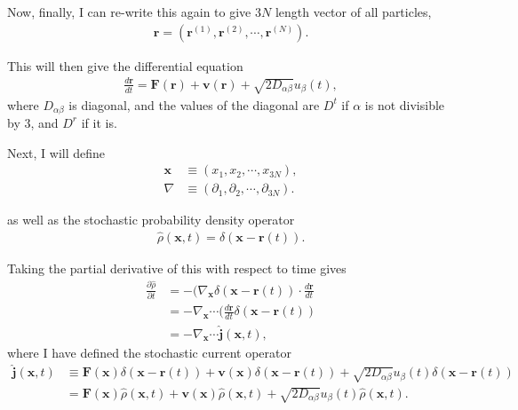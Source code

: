 \documentclass{article}
\begin{document}
Now, finally, I can re-write this again to give $3N$ length vector of all particles,
\begin{align}
    \bm{r}=(\bm{r}^{(1)},\bm{r}^{(2)},\cdots,\bm{r}^{(N)}).
\end{align}

This will then give the differential equation
\begin{align}
  \frac{d\bm{r}}{dt}=\bm{F}(\bm{r})+\bm{v}(\bm{r})
  +\sqrt{2D_{\alpha\beta}}u_{\beta}(t),
\end{align}
where $D_{\alpha\beta}$ is diagonal, and the values of the diagonal are $D^t$ if $\alpha$ is
not divisible by $3$, and $D^r$ if it is.

Next, I will define
\begin{align}
  \bm{x}&\equiv(x_1,x_2,\cdots,x_{3N}),\\
  \nabla&\equiv(\partial_1,\partial_2,\cdots,\partial_{3N}).
\end{align}

as well as the stochastic probability density operator
\begin{align}
  \hat{\rho}(\bm{x},t)=\delta(\bm{x}-\bm{r}(t)).
\end{align}

Taking the partial derivative of this with respect to time gives
\begin{align}
  \frac{\partial\hat{\rho}}{\partial t}&=-(\nabla_{\bm{x}}\delta(\bm{x}-\bm{r}(t))
                                         \cdot\frac{d\bm{r}}{dt}\nonumber\\
                                       &=-\nabla_{\bm{x}}\cdots(\frac{d\bm{r}}{dt}
                                         \delta(\bm{x}-\bm{r}(t))\nonumber\\
                                       &=-\nabla_{\bm{x}}\cdots\hat{\bm{j}}(\bm{x},t),
\end{align}
where I have defined the stochastic current operator
\begin{align}
  \hat{\bm{j}}(\bm{x},t)&\equiv\bm{F}(\bm{x})\delta(\bm{x}-\bm{r}(t))
                          +\bm{v}(\bm{x})\delta(\bm{x}-\bm{r}(t))
                          +\sqrt{2D_{\alpha\beta}}u_{\beta}(t)
                          \delta(\bm{x}-\bm{r}(t))\nonumber\\
                        &=\bm{F}(\bm{x})\hat{\rho}(\bm{x},t)
                          +\bm{v}(\bm{x})\hat{\rho}(\bm{x},t)
                          +\sqrt{2D_{\alpha\beta}}u_{\beta}(t)\hat{\rho}(\bm{x},t).
\end{align}
\end{document}
